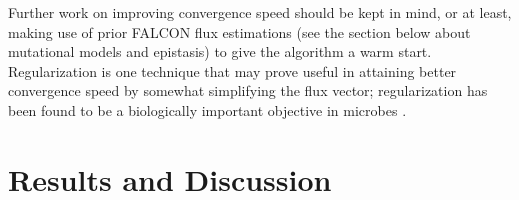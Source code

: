 Further work on improving convergence speed should be kept in mind, or
at least, making use of prior FALCON flux estimations (see the section
below about mutational models and epistasis) to give the algorithm a
warm start.  Regularization is one technique that may prove useful in
attaining better convergence speed by somewhat simplifying the flux
vector; regularization has been found to be a biologically important
objective in microbes \citep{Schuetz2012}.







\section{Results and Discussion}

